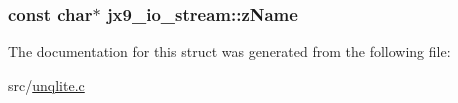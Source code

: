 \hypertarget{structjx9__io__stream_ab2a6828551a33585ef5e2d49cff917f6}{
\subsubsection[{z\-Name}]{\setlength{\rightskip}{0pt plus 5cm}const char$\ast$ jx9\-\_\-io\-\_\-stream\-::z\-Name}}\label{d0/d90/structjx9__io__stream_ab2a6828551a33585ef5e2d49cff917f6}


The documentation for this struct was generated from the following file\-:\begin{DoxyCompactItemize}
\item 
src/\hyperlink{unqlite_8c}{unqlite.\-c}\end{DoxyCompactItemize}
